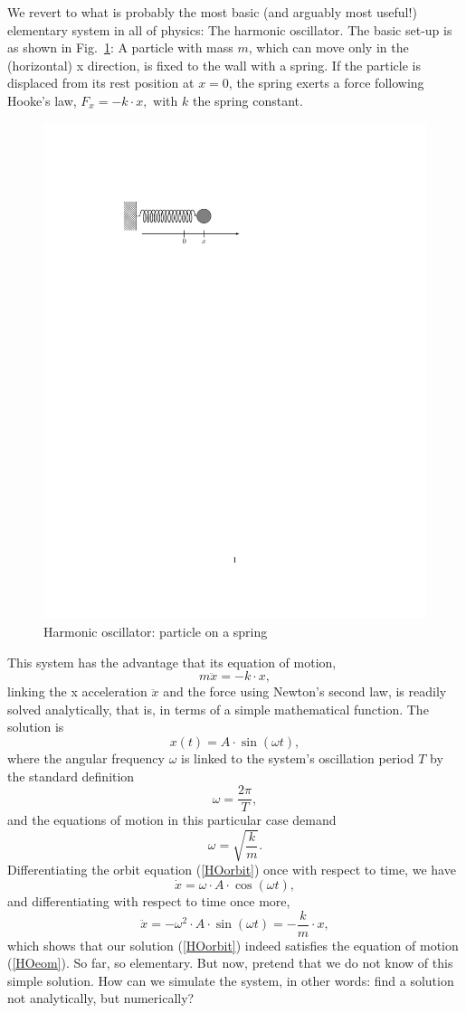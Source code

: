 \documentclass[twocolumn,apj]{openjournal}
\newcommand{\be}{\begin{equation}}
\newcommand{\ee}{\end{equation}}
\begin{document}
We revert to what is probably the most basic (and arguably most useful!) elementary system in all of physics: The harmonic oscillator. The basic set-up is as shown in Fig.~\ref{HarmonicSetup}: A particle with mass $m$, which can move only in the (horizontal) x direction, is fixed to the wall with a spring. If the particle is displaced from its rest position at $x=0$, the spring exerts a force following Hooke's law, $F_x = -k\cdot x,$ with $k$ the spring constant. 
\begin{figure}[htbp]
\begin{center}
\includegraphics[width=0.7\linewidth]{spring-setup.pdf}
\caption{Harmonic oscillator: particle on a spring}
\label{HarmonicSetup}
\end{center}
\end{figure}
This system has the advantage that its equation of motion,
\be
m\ddot{x} = -k\cdot x,
\label{HOeom}
\ee
linking the x acceleration $\ddot{x}$ and the force using Newton's second law, is readily solved analytically, that is, in terms of a simple mathematical function. The solution is 
\be
x(t) = A\cdot\sin(\omega t),
\label{HOorbit}
\ee
where the angular frequency $\omega$ is linked to the system's oscillation period $T$ by the standard definition
\be
\omega = \frac{2\pi}{T},
\ee
and the equations of motion in this particular case demand
\be
\omega = \sqrt{\frac{k}{m}}.
\ee
Differentiating the orbit equation (\ref{HOorbit}) once with respect to time, we have
\be
\dot{x} = \omega\cdot A\cdot\cos(\omega t),
\ee
and differentiating with respect to time once more,
\be
\ddot{x} = -\omega^2\cdot A\cdot \sin(\omega t) = -\frac{k}{m}\cdot x,
\ee
which shows that our solution (\ref{HOorbit}) indeed satisfies the equation of motion (\ref{HOeom}). So far, so elementary. But now, pretend that we do not know of this simple solution. How can we simulate the system, in other words: find a solution not analytically, but numerically?
\end{document}
